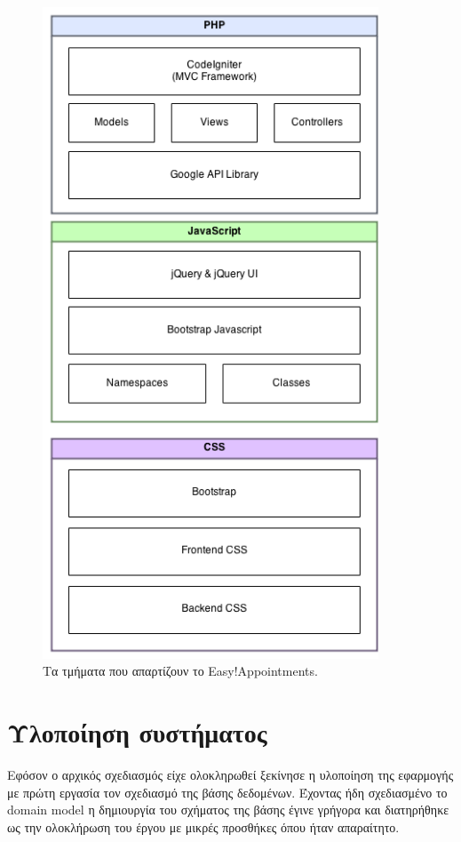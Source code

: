 \begin{figure}[ht!]
\centering
\includegraphics[width=100mm]{images/system-architecture.png}
\caption{Τα τμήματα που απαρτίζουν το Easy!Appointments.}
\label{system-architecture}
\end{figure}

\section{Υλοποίηση συστήματος}
Εφόσον ο αρχικός σχεδιασμός είχε ολοκληρωθεί ξεκίνησε η υλοποίηση της εφαρμογής με πρώτη εργασία τον σχεδιασμό της βάσης δεδομένων. Έχοντας ήδη σχεδιασμένο το domain model η δημιουργία του σχήματος της βάσης έγινε γρήγορα και διατηρήθηκε ως την ολοκλήρωση του έργου με μικρές προσθήκες όπου ήταν απαραίτητο. 

